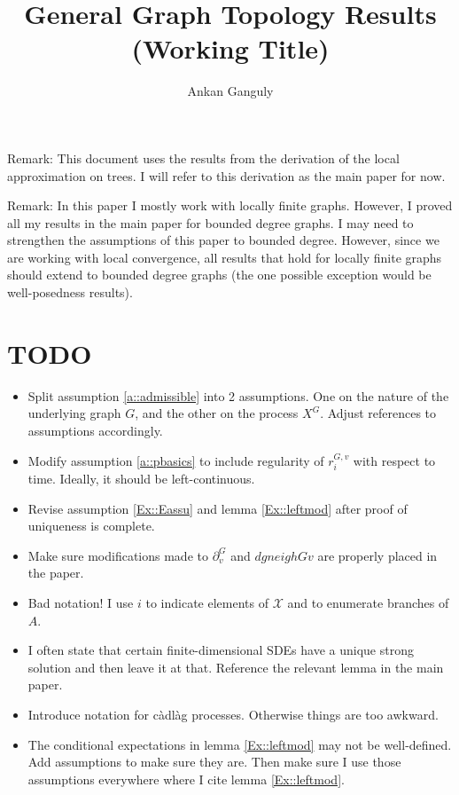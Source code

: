 \documentclass[12pt]{article}
\newcommand{\skipLine}{\vspace{12pt}}
\newcommand{\mc}{\mathcal}
\newcommand{\sta}{\mc{X}}							%
\newcommand{\gneigh}[2]{\partial^{#1}_{#2}}			%
\newcommand{\Xf}{X}									%
\newcommand{\rate}{r}								%
\newcommand{\gind}[1]{^{#1}}						%
\newcommand{\stpara}[1]{_{#1}}						%
\newcommand{\gvpara}[2]{^{#1,#2}}					%
\begin{document}
\title{General Graph Topology Results (Working Title)}
\author{Ankan Ganguly}

\maketitle

Remark: This document uses the results from the derivation of the local approximation on trees. I will refer to this derivation as the main paper for now.

\skipLine

Remark: In this paper I mostly work with locally finite graphs. However, I proved all my results in the main paper for bounded degree graphs. I may need to strengthen the assumptions of this paper to bounded degree. However, since we are working with local convergence, all results that hold for locally finite graphs should extend to bounded degree graphs (the one possible exception would be well-posedness results).

\section{TODO}

\begin{itemize}
\item Split assumption \ref{a::admissible} into 2 assumptions. One on the nature of the underlying graph \(G\), and the other on the process \(\Xf\gind{G}\). Adjust references to assumptions accordingly.

\item Modify assumption \ref{a::pbasics} to include regularity of \(\rate\gvpara{G}{v}\stpara{i}\) with respect to time. Ideally, it should be left-continuous.

\item Revise assumption \ref{Ex::Eassu} and lemma \ref{Ex::leftmod} after proof of uniqueness is complete.

\item Make sure modifications made to \(\gneigh{G}{v}\) and \(dgneigh{G}{v}\) are properly placed in the paper.

\item Bad notation! I use \(i\) to indicate elements of \(\sta\) and to enumerate branches of \(A\).

\item I often state that certain finite-dimensional SDEs have a unique strong solution and then leave it at that. Reference the relevant lemma in the main paper.

\item Introduce notation for c\`adl\`ag processes. Otherwise things are too awkward.

\item The conditional expectations in lemma \ref{Ex::leftmod} may not be well-defined. Add assumptions to make sure they are. Then make sure I use those assumptions everywhere where I cite lemma \ref{Ex::leftmod}.
\end{itemize}
\end{document}
